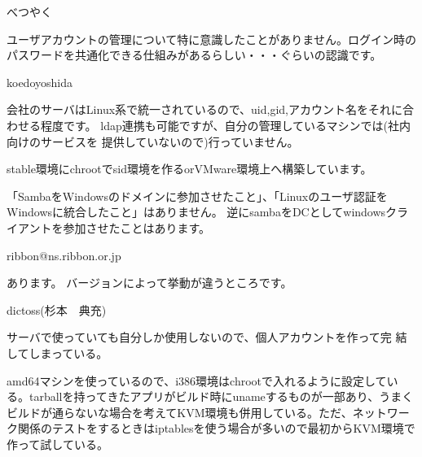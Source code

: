 
\begin{prework}{ べつやく }


ユーザアカウントの管理について特に意識したことがありません。ログイン時の
 パスワードを共通化できる仕組みがあるらしい・・・ぐらいの認識です。

\end{prework}

\begin{prework}{ koedoyoshida }


会社のサーバはLinux系で統一されているので、uid,gid,アカウント名をそれに合わせる程度です。
ldap連携も可能ですが、自分の管理しているマシンでは(社内向けのサービスを
 提供していないので)行っていません。


stable環境にchrootでsid環境を作るorVMware環境上へ構築しています。


「SambaをWindowsのドメインに参加させたこと」、「Linuxのユーザ認証をWindowsに統合したこと」はありません。
逆にsambaをDCとしてwindowsクライアントを参加させたことはあります。
\end{prework}

\begin{prework}{ ribbon@ns.ribbon.or.jp }

あります。
バージョンによって挙動が違うところです。
\end{prework}

\begin{prework}{ dictoss(杉本　典充) }


サーバで使っていても自分しか使用しないので、個人アカウントを作って完
 結してしまっている。


amd64マシンを使っているので、i386環境はchrootで入れるように設定している。tarballを持ってきたアプリがビルド時にunameするものが一部あり、うまくビルドが通らないな場合を考えてKVM環境も併用している。ただ、ネットワーク関係のテストをするときはiptablesを使う場合が多いので最初からKVM環境で作って試している。
\end{prework}

